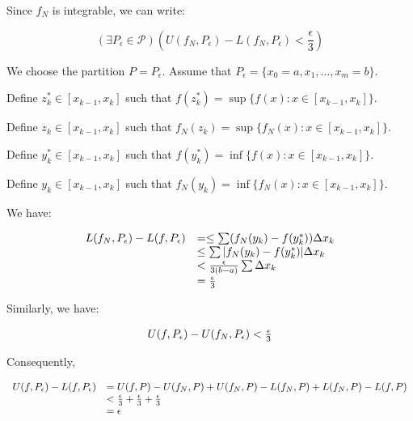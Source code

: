 \documentclass[10pt]{article}
\begin{document}
Since $\displaystyle f_{N}$ is integrable, we can write:


\begin{equation*}
( \exists P_{\epsilon } \in \mathcal{P})\left( U( f_{N} ,P_{\epsilon }) -L( f_{N} ,P_{\epsilon }) < \frac{\epsilon }{3}\right)
\end{equation*}


We choose the partition $\displaystyle P=P_{\epsilon }$. Assume that $\displaystyle P_{\epsilon } =\{x_{0} =a,x_{1} ,\dotsc ,x_{m} =b\}$.



Define $\displaystyle z_{k}^{*} \in [ x_{k-1} ,x_{k}]$ such that $\displaystyle f( z_{k}^{*}) =\sup \{f( x) :x\in [ x_{k-1} ,x_{k}]\}$. 

Define $\displaystyle z_{k} \in [ x_{k-1} ,x_{k}]$ such that $\displaystyle f_N( z_{k}) =\sup \{f_N( x) :x\in [ x_{k-1} ,x_{k}]\}$. 

Define $\displaystyle y_{k}^{*} \in [ x_{k-1} ,x_{k}]$ such that $\displaystyle f( y_{k}^{*}) =\inf\{f( x) :x\in [ x_{k-1} ,x_{k}]\}$. 

Define $\displaystyle y_{k} \in [ x_{k-1} ,x_{k}]$ such that $\displaystyle f_N( y_{k}) =\inf\{f_N( x) :x\in [ x_{k-1} ,x_{k}]\}$. 

We have:

\begin{equation*}
\begin{array}{ c l }
L( f_{N} ,P_{\epsilon }) -L( f,P_{\epsilon }) &= \leq \sum ( f_{N}( y_{k}) -f( y_{k}^{*})) \Delta x_{k}\\
 & \leq \sum |f_{N}( y_{k}) -f( y_{k}^{*})| \Delta x_{k}\\
 & < \frac{\epsilon}{3(b-a)} \sum \Delta x_{k} \\
 &= \frac{\epsilon}{3}
\end{array}
\end{equation*}

Similarly, we have:

\begin{equation*}
\begin{array}{ c l }
U( f ,P_{\epsilon }) -U( f_N,P_{\epsilon }) < \frac{\epsilon}{3}
\end{array}
\end{equation*}

Consequently,

\begin{equation*}
\begin{array}{ c l }
U( f,P_{\epsilon }) -L( f,P_{\epsilon }) & =U( f,P) -U( f_{N} ,P) +U( f_{N} ,P) -L( f_{N} ,P) +L( f_{N} ,P) -L( f,P)\\
&< \frac{\epsilon}{3} + \frac{\epsilon}{3} + \frac{\epsilon}{3} \\
&= \epsilon
\end{array}
\end{equation*}
\end{document}
